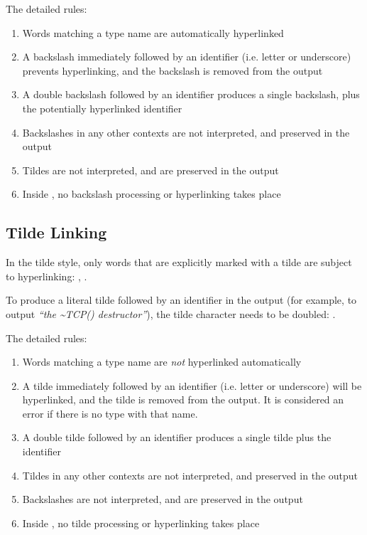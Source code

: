 The detailed rules:

\begin{enumerate}
  \item Words matching a type name are automatically hyperlinked
  \item A backslash immediately followed by an identifier (i.e. letter or underscore)
        prevents hyperlinking, and the backslash is removed from the output
  \item A double backslash followed by an identifier produces a single backslash,
        plus the potentially hyperlinked identifier
  \item Backslashes in any other contexts are not interpreted, and preserved in the output
  \item Tildes are not interpreted, and are preserved in the output
  \item Inside , no backslash processing or hyperlinking takes place
\end{enumerate}

\subsection{Tilde Linking}
\label{sec:neddoc:tilde-linking}

In the tilde style, only words that are explicitly marked with a tilde are
subject to hyperlinking: ,
.

To produce a literal tilde followed by an identifier in the output (for example,
to output \textit{``the {\textasciitilde}TCP() destructor''}), the tilde character
needs to be doubled: .

The detailed rules:

\begin{enumerate}
  \item Words matching a type name are \textit{not} hyperlinked automatically
  \item A tilde immediately followed by an identifier (i.e. letter or underscore)
        will be hyperlinked, and the tilde is removed from the output. It is
        considered an error if there is no type with that name.
  \item A double tilde followed by an identifier produces a single tilde plus the identifier
  \item Tildes in any other contexts are not interpreted, and preserved in the output
  \item Backslashes are not interpreted, and are preserved in the output
  \item Inside , no tilde processing or hyperlinking takes place
\end{enumerate}


